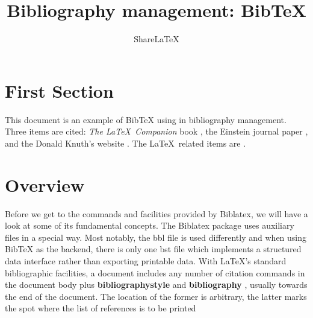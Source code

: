 \documentclass[a4paper,10pt]{article}
\title{Bibliography management: BibTeX}
\author{Share\LaTeX}
\begin{document}
\maketitle
\tableofcontents
\medskip

\section{First Section}
This document is an example of BibTeX using in bibliography management. 
Three items are cited: \textit{The \LaTeX\ Companion} book \cite{latexcompanion}, 
the Einstein journal paper \cite{einstein}, and the Donald Knuth's 
website \cite{knuthwebsite}. The \LaTeX\ related items are 
\cite{latexcompanion,knuthwebsite}. 

\section{Overview}
Before we get to the commands and facilities provided by Biblatex, we will have
a look at some of its fundamental concepts. The Biblatex package uses auxiliary
files in a special way. Most notably, the bbl
file is used differently and when using
BibTeX as the backend, there is only one
bst
file which implements a structured data
interface rather than exporting printable data. With LaTeX’s standard bibliographic
facilities, a document includes any number of citation commands in the document
body plus
\textbf{bibliographystyle}
and
\textbf{bibliography}
, usually towards the
end of the document. The location of the former is arbitrary, the latter marks the
spot where the list of references is to be printed

\newpage

\end{document}
